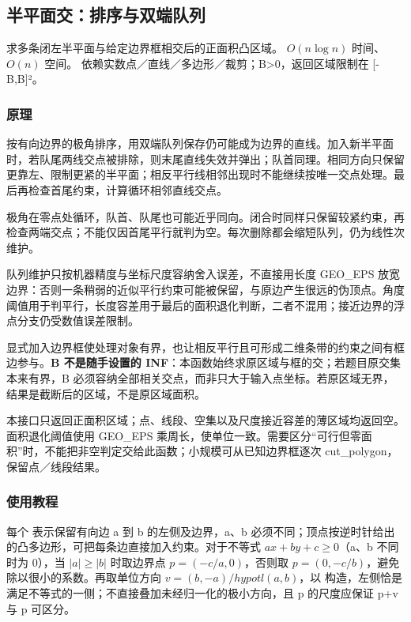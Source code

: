 \subsection{半平面交：排序与双端队列}
\label{geo:halfplane}
\AlgorithmInfo
    {求多条闭左半平面与给定边界框相交后的正面积凸区域。}
    {$O(n\log n)$ 时间、$O(n)$ 空间。}
    {依赖实数点／直线／多边形／裁剪；B>0，返回区域限制在 [-B,B]²。}
\subsubsection*{原理}

按有向边界的极角排序，用双端队列保存仍可能成为边界的直线。加入新半平面时，若队尾两线交点被排除，则末尾直线失效并弹出；队首同理。相同方向只保留更靠左、限制更紧的半平面；相反平行线相邻出现时不能继续按唯一交点处理。最后再检查首尾约束，计算循环相邻直线交点。

极角在零点处循环，队首、队尾也可能近乎同向。闭合时同样只保留较紧约束，再检查两端交点；不能仅因首尾平行就判为空。每次删除都会缩短队列，仍为线性次维护。

队列维护只按机器精度与坐标尺度容纳舍入误差，不直接用长度 GEO\_EPS 放宽边界：否则一条稍弱的近似平行约束可能被保留，与原边产生很远的伪顶点。角度阈值用于判平行，长度容差用于最后的面积退化判断，二者不混用；接近边界的浮点分支仍受数值误差限制。

显式加入边界框使处理对象有界，也让相反平行且可形成二维条带的约束之间有框边参与。\textbf{B 不是随手设置的 INF}：本函数始终求原区域与框的交；若题目原交集本来有界，B 必须容纳全部相关交点，而非只大于输入点坐标。若原区域无界，结果是截断后的区域，不是原区域面积。

本接口只返回正面积区域；点、线段、空集以及尺度接近容差的薄区域均返回空。面积退化阈值使用 GEO\_EPS 乘周长，使单位一致。需要区分“可行但零面积”时，不能把非空判定交给此函数；小规模可从已知边界框逐次 cut\_polygon，保留点／线段结果。

\subsubsection*{使用教程}
每个  表示保留有向边 a 到 b 的左侧及边界，a、b 必须不同；顶点按逆时针给出的凸多边形，可把每条边直接加入约束。对于不等式 $ax+by+c\ge0$（a、b 不同时为 0），当 $|a|\ge|b|$ 时取边界点 $p=(-c/a,0)$，否则取 $p=(0,-c/b)$，避免除以很小的系数。再取单位方向 $v=(b,-a)/hypotl(a,b)$，以  构造，左侧恰是满足不等式的一侧；不直接叠加未经归一化的极小方向，且 p 的尺度应保证 p+v 与 p 可区分。

